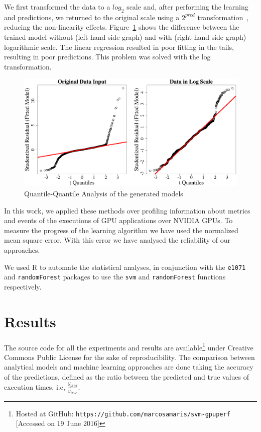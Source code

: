 We first transformed the data to a $log_2$ scale and, after performing the learning and predictions, we returned to the original scale using a $2^{pred}$ transformation~\cite{Barnes:2008:RAS}, reducing the non-linearity effects. Figure~\ref{fig:QQplot} shows the difference between the trained model without (left-hand side graph) and with (right-hand side graph) logarithmic scale. The linear regression resulted in poor fitting in the tails, resulting in poor predictions. This problem was solved with the log transformation.



\begin{figure}[htpb]
 \centering
 \includegraphics[scale=.2]{./images/QQplot.eps}
 \caption{Quantile-Quantile Analysis of the generated models}
 \label{fig:QQplot}
\end{figure}

In this work, we applied these methods over profiling information about metrics and events of the executions of GPU applications over NVIDIA GPUs. To measure the progress of the learning algorithm we have used the normalized mean square error. With this error we have analysed the reliability of our approaches.

We used R to automate the statistical analyses, in conjunction with the \texttt{e1071} and \texttt{randomForest} packages to use the \texttt{svm} and \texttt{randomForest} functions respectively.  

\section{Results}\label{sec:Results}

The  source code for all the experiments and results are
available\footnote{Hosted at GitHub: \texttt{\scriptsize https://github.com/marcosamaris/svm-gpuperf} [Accessed on 19 June 2016]} under Creative Commons Public License for the sake of reproducibility. The comparison between analytical models and machine learning approaches are done taking the accuracy of the predictions, defined as the ratio between the predicted and true values of execution times, i.e, $\frac{y_{pred}} { y_{true}}$.

